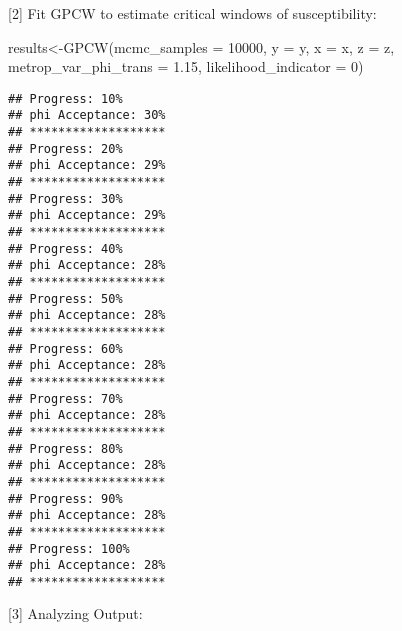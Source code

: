 \documentclass[
]{article}
\newenvironment{Shaded}{\begin{snugshade}}{\end{snugshade}}
\newcommand{\AttributeTok}[1]{\textcolor[rgb]{0.77,0.63,0.00}{#1}}
\newcommand{\DecValTok}[1]{\textcolor[rgb]{0.00,0.00,0.81}{#1}}
\newcommand{\FloatTok}[1]{\textcolor[rgb]{0.00,0.00,0.81}{#1}}
\newcommand{\FunctionTok}[1]{\textcolor[rgb]{0.00,0.00,0.00}{#1}}
\newcommand{\NormalTok}[1]{#1}
\newcommand{\OtherTok}[1]{\textcolor[rgb]{0.56,0.35,0.01}{#1}}
\begin{document}
{[}2{]} Fit GPCW to estimate critical windows of susceptibility:

\begin{Shaded}
\begin{Highlighting}[]
\NormalTok{results}\OtherTok{\textless{}{-}}\FunctionTok{GPCW}\NormalTok{(}\AttributeTok{mcmc\_samples =} \DecValTok{10000}\NormalTok{,}
              \AttributeTok{y =}\NormalTok{ y, }\AttributeTok{x =}\NormalTok{ x, }\AttributeTok{z =}\NormalTok{ z,}
              \AttributeTok{metrop\_var\_phi\_trans =} \FloatTok{1.15}\NormalTok{,}
              \AttributeTok{likelihood\_indicator =} \DecValTok{0}\NormalTok{)}
\end{Highlighting}
\end{Shaded}

\begin{verbatim}
## Progress: 10%
## phi Acceptance: 30%
## *******************
## Progress: 20%
## phi Acceptance: 29%
## *******************
## Progress: 30%
## phi Acceptance: 29%
## *******************
## Progress: 40%
## phi Acceptance: 28%
## *******************
## Progress: 50%
## phi Acceptance: 28%
## *******************
## Progress: 60%
## phi Acceptance: 28%
## *******************
## Progress: 70%
## phi Acceptance: 28%
## *******************
## Progress: 80%
## phi Acceptance: 28%
## *******************
## Progress: 90%
## phi Acceptance: 28%
## *******************
## Progress: 100%
## phi Acceptance: 28%
## *******************
\end{verbatim}

{[}3{]} Analyzing Output:
\end{document}
